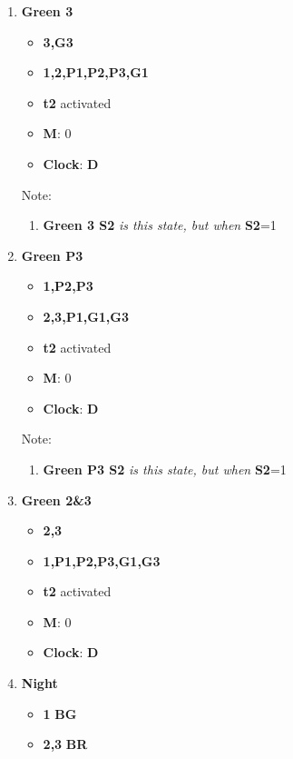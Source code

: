 \documentclass[letterpaper]{article}
\begin{document}
\begin{enumerate}
       
 \item \textbf{Green 3}
       \begin{itemize}
        \item {\color{green}\textbf{3,G3}}
        \item {\color{red}\textbf{1,2,P1,P2,P3,G1}}
        \item \textbf{t2} activated
        \item \textbf{M}: 0
        \item \textbf{Clock}: \textbf{D}
       \end{itemize}
       Note:
       \begin{enumerate}
        \item \textbf{Green 3 S2} \textit{is this state, but when} \textbf{S2}=1
       \end{enumerate}
 \item \textbf{Green P3}
       \begin{itemize}
        \item {\color{green}\textbf{1,P2,P3}}
        \item {\color{red}\textbf{2,3,P1,G1,G3}}
        \item \textbf{t2} activated
        \item \textbf{M}: 0
        \item \textbf{Clock}: \textbf{D}
       \end{itemize}
       Note:
       \begin{enumerate}
        \item \textbf{Green P3 S2} \textit{is this state, but when} \textbf{S2}=1
       \end{enumerate}
 \item \textbf{Green 2\&3}
       \begin{itemize}
        \item {\color{green}\textbf{2,3}}
        \item {\color{red}\textbf{1,P1,P2,P3,G1,G3}}
        \item \textbf{t2} activated
        \item \textbf{M}: 0
        \item \textbf{Clock}: \textbf{D}
       \end{itemize}
 \item \textbf{Night}
       \begin{itemize}
        \item {\color{green}\textbf{1}} \textbf{BG}
        \item {\color{red}\textbf{2,3}} \textbf{BR}

\end{itemize}
\end{enumerate}
\end{document}
